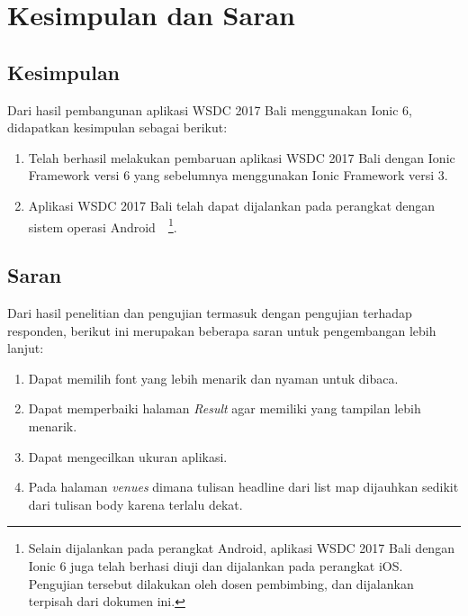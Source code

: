 \chapter{Kesimpulan dan Saran}
\label{chap:kesimpulanSaran}

\section{Kesimpulan} 
\label{sec:kesimpulan}

Dari hasil pembangunan aplikasi WSDC 2017 Bali menggunakan Ionic 6, didapatkan kesimpulan sebagai berikut:

\begin{enumerate}
	\item Telah berhasil melakukan pembaruan aplikasi WSDC 2017 Bali dengan Ionic Framework versi 6 yang sebelumnya menggunakan Ionic Framework versi 3.
	\item Aplikasi WSDC 2017 Bali telah dapat dijalankan pada perangkat dengan sistem operasi Android~~\footnote{Selain dijalankan pada perangkat Android, aplikasi WSDC 2017 Bali dengan Ionic 6 juga telah berhasi diuji dan dijalankan pada perangkat iOS. Pengujian tersebut dilakukan oleh dosen pembimbing, dan dijalankan terpisah dari dokumen ini.}.
\end{enumerate}

\section{Saran} 
\label{sec:saran}

Dari hasil penelitian dan pengujian termasuk dengan pengujian terhadap responden, berikut ini merupakan beberapa saran untuk pengembangan lebih lanjut:

\begin{enumerate}
	\item Dapat memilih font yang lebih menarik dan nyaman untuk dibaca.
	\item Dapat memperbaiki halaman \textit{Result} agar memiliki yang tampilan lebih menarik.
	\item Dapat mengecilkan ukuran aplikasi.
	\item Pada halaman \textit{venues} dimana tulisan headline dari list map dijauhkan sedikit dari tulisan body karena terlalu dekat.
\end{enumerate}
